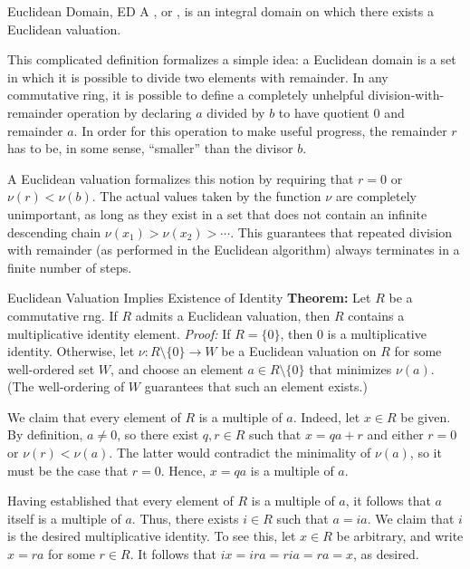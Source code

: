 \begin{dfnbox}{Euclidean Domain, ED}
	A , or , is an integral domain on which there exists a Euclidean valuation.
\end{dfnbox}

This complicated definition formalizes a simple idea: a Euclidean domain is a set in which it is possible to divide two elements with remainder. In any commutative ring, it is possible to define a completely unhelpful division-with-remainder operation by declaring $a$ divided by $b$ to have quotient $0$ and remainder $a$. In order for this operation to make useful progress, the remainder $r$ has to be, in some sense, ``smaller'' than the divisor $b$.

A Euclidean valuation formalizes this notion by requiring that $r = 0$ or $\nu(r) < \nu(b)$. The actual values taken by the function $\nu$ are completely unimportant, as long as they exist in a set that does not contain an infinite descending chain $\nu(x_1) > \nu(x_2) > \cdots$. This guarantees that repeated division with remainder (as performed in the Euclidean algorithm) always terminates in a finite number of steps.

\begin{thmbox}{Euclidean Valuation Implies Existence of Identity}
	\textbf{Theorem:} Let $R$ be a commutative rng. If $R$ admits a Euclidean valuation, then $R$ contains a multiplicative identity element.
\tcblower
	\textit{Proof:} If $R = \{0\}$, then $0$ is a multiplicative identity. Otherwise, let $\nu: R \setminus \{0\} \to W$ be a Euclidean valuation on $R$ for some well-ordered set $W$, and choose an element $a \in R \setminus \{0\}$ that minimizes $\nu(a)$. (The well-ordering of $W$ guarantees that such an element exists.)

	We claim that every element of $R$ is a multiple of $a$. Indeed, let $x \in R$ be given. By definition, $a \ne 0$, so there exist $q, r \in R$ such that $x = qa + r$ and either $r = 0$ or $\nu(r) < \nu(a)$. The latter would contradict the minimality of $\nu(a)$, so it must be the case that $r = 0$. Hence, $x = qa$ is a multiple of $a$.

	Having established that every element of $R$ is a multiple of $a$, it follows that $a$ itself is a multiple of $a$. Thus, there exists $i \in R$ such that $a = ia$. We claim that $i$ is the desired multiplicative identity. To see this, let $x \in R$ be arbitrary, and write $x = ra$ for some $r \in R$. It follows that $ix = ira = ria = ra = x$, as desired.
\end{thmbox}

